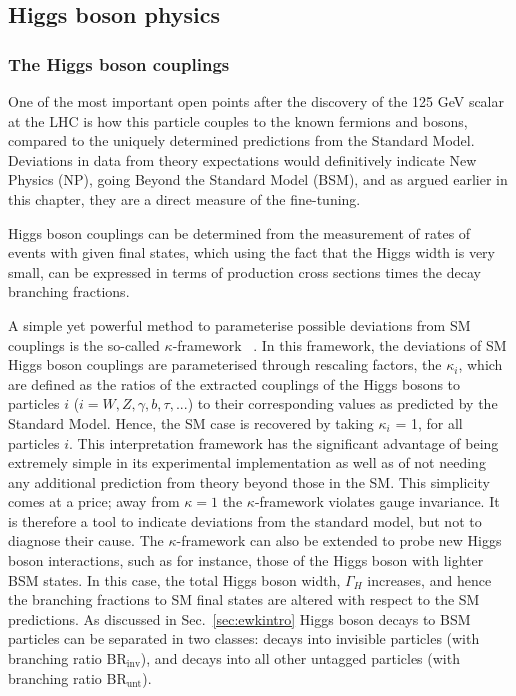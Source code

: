 \documentclass[../report.tex]{subfiles}
\newcommand{\BRinv}{BR$_{\textrm{inv}}$}
\newcommand{\BRunt}{BR$_{\textrm{unt}}$}
\begin{document}
\subsection{Higgs boson physics}
\label{sec:higgsfuture}

\subsubsection*{The Higgs boson couplings}
One of the most important open points after the discovery of the 125 GeV scalar at the LHC is how this particle couples to the known fermions and bosons, compared to the uniquely determined predictions from the Standard Model. Deviations in data from theory expectations would definitively indicate New Physics (NP), going Beyond the Standard Model (BSM), and as argued earlier in this chapter, they are a direct measure of the fine-tuning. 

Higgs boson couplings can be determined from the measurement of rates of events with given final states, which using the fact that the Higgs width is very small, can be expressed in terms of production cross sections times the decay branching fractions.

A simple yet powerful method to parameterise possible deviations from SM couplings is the so-called $\kappa$-framework ~\cite{LHCHiggsCrossSectionWorkingGroup:2012nn,LHCHXSWG3}.
In this framework, the deviations of SM Higgs boson couplings are parameterised through rescaling factors, the $\kappa_{i}$, which are defined as the ratios of the extracted couplings of the Higgs bosons to particles $i$ ($i=W, Z, \gamma, b, \tau,...$) to their corresponding values as predicted by the Standard Model.
Hence, the SM case is recovered by taking $\kappa_{i}$ = 1, for all particles $i$. This interpretation framework has the significant advantage of being extremely simple in its experimental implementation as well as of not needing any additional prediction from theory beyond those in the SM. This simplicity comes at a price; away from $\kappa=1$ the $\kappa$-framework violates gauge invariance. It is therefore a tool to indicate deviations from the standard model, but not to diagnose their cause.
The $\kappa$-framework can also be extended to probe new Higgs boson interactions, such as for instance, those of the Higgs boson with lighter BSM states. In this case, the total Higgs boson width, $\Gamma_H$ increases, and hence the branching fractions to SM final states are altered with respect to the SM predictions.  As discussed in Sec.~\ref{sec:ewkintro} Higgs boson decays to BSM particles can be separated in two classes: decays into invisible particles (with branching ratio \BRinv), and decays into all other untagged particles  (with branching ratio \BRunt).
\end{document}
